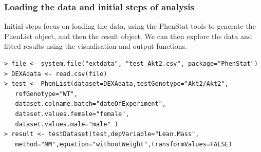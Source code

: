\documentclass[12pt,a4paper]{article}
\begin{document}
\subsubsection{Loading the data and initial steps of analysis}
Initial steps focus on loading the data, using the PhenStat tools to generate the PhenList object, and then the result object.  
We can then explore the data and fitted results using the visualisation and output functions. 

  
\begingroup
    \fontsize{8pt}{12pt}\selectfont
\begin{verbatim}
> file <- system.file("extdata", "test_Akt2.csv", package="PhenStat") 
> DEXAdata <- read.csv(file)
> test <- PhenList(dataset=DEXAdata,testGenotype="Akt2/Akt2",  
   refGenotype="WT",
   dataset.colname.batch="dateOfExperiment", 
   dataset.values.female="female", 
   dataset.values.male="male" )
> result <- testDataset(test,depVariable="Lean.Mass",
   method="MM",equation="withoutWeight",transformValues=FALSE)
\end{verbatim}
\endgroup 
\end{document}

